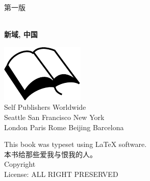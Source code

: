 \documentclass{book}
\makeatletter
\newcommand{\booksubtitle}{面向计算的线性代数}
\newcommand{\booklicense}{ALL RIGHT PRESERVED}
\newcommand{\authorsubtitle}{新域, 中国}
\newcommand{\bookauthor}{\@author}
\makeatother
\begin{document}
\begin{CJK}{UTF8}{gbsn}
\begin{titlepage}
\begin{flushleft}

            \begin{flushright}
                \Large 第一版
            \end{flushright}

            \vspace{\fill}

            \textbf{\large \bookauthor}\\[3.5pt]
            \textbf{\large {\authorsubtitle}}

            \vspace{\fill}

            \begin{center}
                \includegraphics{booksvg.pdf}\\[4pt]
                \small{Self Publishers Worldwide\\
                    Seattle San Francisco New York\\
                    London Paris Rome Beijing Barcelona}
            \end{center}

        \end{flushleft}
    \end{titlepage}
    \restoregeometry

    \thispagestyle{empty}

    \begin{flushleft}
        \vspace*{\fill}
        This book was typeset using \LaTeX{} software.\\
        本书给那些爱我与恨我的人。\\
        \vspace{\fill}
        Copyright \textcopyright{} \the\year{}  \bookauthor\\
        License: \booklicense
    \end{flushleft}


\end{CJK}
\end{document}
